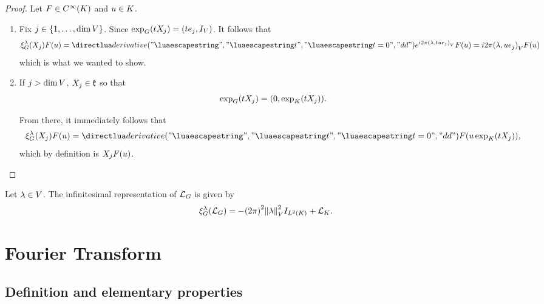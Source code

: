 \begin{proof}
    Let $F \in \SmoothFunctions \CompactGroup$ and $u \in \CompactGroup$.
    \begin{enumerate}
        \item Fix $j \in \{1, \dots, \dim \VectorSpace\}$.
            Since $\exp_\Group(t X_j) = (t e_j, \Id{\VectorSpace})$.
            It follows that
            \begin{align*}
                \Rep{\lambda}(X_j) F(u) = \D*{t}<t = 0> \e^{\i \turn \ip \lambda {t u e_j}} F(u)
                = \i \turn \ip \lambda {u e_j} F(u)
            \end{align*}
            which is what we wanted to show.
        \item If $j > \dim \VectorSpace$, $X_j \in \LieAlgebraCompactGroup$ so that
            \begin{align*}
                \exp_\Group(t X_j) = (0, \exp_\CompactGroup(t X_j)).
            \end{align*}

            From there, it immediately follows that
            \begin{align*}
                \Rep{\lambda}(X_j) F(u)
                = \D*{t}<t = 0> F(u \exp_\CompactGroup(t X_j)),
            \end{align*}
            which by definition is $\LeftDifferentialOperatorFirstOrder{X_j} F(u)$.
    \end{enumerate}
\end{proof}

\begin{corollary}
\label{corollary:infinitesimal_representation_of_the_Laplacian}
    Let $\lambda \in \VectorSpace$.
    The infinitesimal representation of $\Laplacian$ is given by
    \begin{align*}
        \Rep{\lambda}(\Laplacian) = - {(\turn)}^2 \norm{\lambda}^2 \Id{\Lebesgue{2}{\CompactGroup}} + \Laplacian[\CompactGroup].
    \end{align*}
\end{corollary}

\section{Fourier Transform}

\subsection{Definition and elementary properties}

